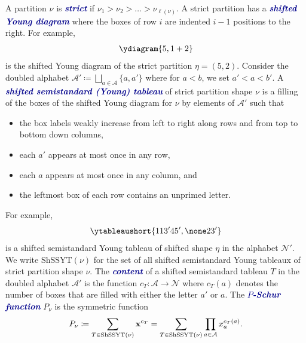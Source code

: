 \documentclass[12 pt]{amsart}
\newcommand{\newword}[1]{\textcolor{darkblue}{\textbf{\emph{#1}}}}
\newcommand{\cA}{\mathcal{A}}
\newcommand{\cN}{\mathcal{N}}
\newcommand{\shSSYT}{\mathrm{ShSSYT}}
\newcommand{\shSYT}{\mathrm{ShSYT}}
\theoremstyle{remark}
\numberwithin{equation}{section}
\begin{document}
A partition $\nu$ is \newword{strict} if $\nu_1 > \nu_2 > \dots > \nu_{\ell(\nu)}$. A strict partition has a \newword{shifted Young diagram} where the boxes of row $i$ are indented $i-1$ positions to the right. For example, 
\[
\ydiagram{5,1+2}
\]
is the shifted Young diagram of the strict partition $\eta = (5,2)$. Consider the doubled alphabet 
$\cA' \coloneqq \bigsqcup_{a \in \cA} \{a, a'\}$ where for $a< b$, we set $a' < a < b'$.
A \newword{shifted semistandard (Young) tableau} of strict partition shape $\nu$ is a filling of the boxes of the shifted Young diagram for $\nu$ by elements of $\cA'$ such that 
\begin{itemize}
    \item the box labels weakly increase from left to right along rows and from top to bottom down columns,
    \item each $a'$ appears at most once in any row,
    \item each $a$ appears at most once in any column, and
    \item the leftmost box of each row contains an unprimed letter.
\end{itemize}
For example,
\[
\ytableaushort{11{3'}{4}{5'},\none 2{3'}}
\]
is a shifted semistandard Young tableau of shifted shape $\eta$ in the alphabet $\cN'$. We write $\shSSYT(\nu)$ for the set of all shifted semistandard Young tableaux of strict partition shape $\nu$. 
The \newword{content} of a shifted semistandard tableau $T$ in the doubled alphabet $\cA'$ is the function $c_T : \cA \to \cN$ where $c_T(a)$ denotes the number of boxes that are filled with either the letter $a'$ or $a$. 
The \newword{$P$-Schur function} $P_\nu$ is the symmetric function 
    $$P_\nu \coloneqq \sum_{T\in \shSSYT(\nu)}{\bf x}^{c_T}=\sum_{T\in \shSSYT(\nu)} \prod_{a \in \cA}x_a^{c_T(a)}.$$
\end{document}

